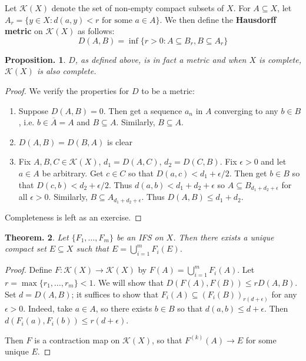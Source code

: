 \documentclass[11pt, a4paper]{memoir}
\theoremstyle{change}
\newtheorem{theorem}{Theorem.}[section]
\newtheorem{proposition}[theorem]{Proposition.}
\theoremstyle{plain}
\theoremstyle{nonumberplain}
\newtheorem{proof}{Proof}
\newcommand{\defn}[1]{{\boldmath\bfseries #1}}
\numberwithin{equation}{section}
\begin{document}
Let $\mathcal{K}(X)$ denote the set of non-empty compact subsets of $X$.
For $A\subseteq X$, let $A_r=\{y\in X:d(a,y)<r\text{ for some }a\in A\}$.
We then define the \defn{Hausdorff metric} on $\mathcal{K}(X)$ as follows:
\begin{equation*}
    D(A,B)=\inf\{r>0:A\subseteq B_r,B\subseteq A_r\}
\end{equation*}
\begin{proposition}
    $D$, as defined above, is in fact a metric and when $X$ is complete, $\mathcal{K}(X)$ is also complete.
\end{proposition}
\begin{proof}
    We verify the properties for $D$ to be a metric:
    \begin{enumerate}[nl,r]
        \item Suppose $D(A,B)=0$.
            Then get a sequence $a_n$ in $A$ converging to any $b\in B$, i.e. $b\in\overline{A}=A$ and $B\subseteq A$.
            Similarly, $B\subseteq A$.
        \item $D(A,B)=D(B,A)$ is clear
        \item Fix $A,B,C\in\mathcal{K}(X)$, $d_1=D(A,C)$, $d_2=D(C,B)$.
            Fix $\epsilon>0$ and let $a\in A$ be arbitrary.
            Get $c\in C$ so that $D(a,c)<d_1+\epsilon/2$.
            Then get $b\in B$ so that $D(c,b)<d_2+\epsilon/2$.
            Thus $d(a,b)<d_1+d_2+\epsilon$ so $A\subseteq B_{d_1+d_2+\epsilon}$ for all $\epsilon>0$.
            Similarly, $B\subseteq A_{d_1+d_2+\epsilon}$.
            Thus $D(A,B)\leq d_1+d_2$.
    \end{enumerate}
    Completeness is left as an exercise.
\end{proof}
\begin{theorem}
    Let $\{F_1,\ldots,F_m\}$ be an IFS on $X$.
    Then there exists a unique compact set $E\subseteq X$ such that $E=\bigcup_{i=1}^m F_i(E)$.
\end{theorem}
\begin{proof}
    Define $F:\mathcal{K}(X)\to\mathcal{K}(X)$ by $F(A)=\bigcup_{i=1}^m F_i(A)$.
    Let $r=\max\{r_1,\ldots,r_m\}<1$.
    We will show that $D(F(A),F(B))\leq r D(A,B)$.
    Set $d=D(A,B)$;  it suffices to show that $F_i(A)\subseteq(F_i(B))_{r(d+\epsilon)}$ for any $\epsilon>0$.
    Indeed, take $a\in A$, so there exists $b\in B$ so that $d(a,b)\leq d+\epsilon$.
    Then $d(F_i(a),F_i(b))\leq r(d+\epsilon)$.

    Then $F$ is a contraction map on $\mathcal{K}(X)$, so that $F^{(k)}(A)\to E$ for some unique $E$.
\end{proof}
\end{document}

